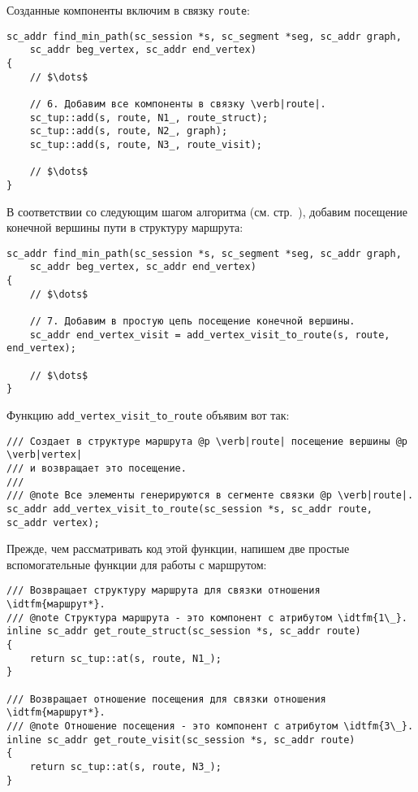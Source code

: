 Созданные компоненты включим в связку \lstinline|route|:

\begin{lstlisting}[texcl]
sc_addr find_min_path(sc_session *s, sc_segment *seg, sc_addr graph,
    sc_addr beg_vertex, sc_addr end_vertex)
{
    // $\dots$

    // 6. Добавим все компоненты в связку \verb|route|.
    sc_tup::add(s, route, N1_, route_struct);
    sc_tup::add(s, route, N2_, graph);
    sc_tup::add(s, route, N3_, route_visit);

    // $\dots$
}
\end{lstlisting}

В соответствии со следующим шагом алгоритма
(см. стр.~\pageref{astep:S9_Add_end_visit_to_route_tuple}),
добавим посещение конечной вершины пути в структуру маршрута:

\begin{lstlisting}[texcl]
sc_addr find_min_path(sc_session *s, sc_segment *seg, sc_addr graph,
    sc_addr beg_vertex, sc_addr end_vertex)
{
    // $\dots$

    // 7. Добавим в простую цепь посещение конечной вершины.
    sc_addr end_vertex_visit = add_vertex_visit_to_route(s, route, end_vertex);

    // $\dots$
}
\end{lstlisting}

Функцию \lstinline|add_vertex_visit_to_route| объявим вот так:

\begin{lstlisting}[texcl]
/// Создает в структуре маршрута @p \verb|route| посещение вершины @p \verb|vertex|
/// и возвращает это посещение.
///
/// @note Все элементы генерируются в сегменте связки @p \verb|route|.
sc_addr add_vertex_visit_to_route(sc_session *s, sc_addr route, sc_addr vertex);
\end{lstlisting}

Прежде, чем рассматривать код этой функции, напишем две простые
вспомогательные функции для работы с маршрутом:

\begin{lstlisting}[texcl]
/// Возвращает структуру маршрута для связки отношения \idtfm{маршрут*}.
/// @note Структура маршрута - это компонент с атрибутом \idtfm{1\_}.
inline sc_addr get_route_struct(sc_session *s, sc_addr route)
{
    return sc_tup::at(s, route, N1_);
}

/// Возвращает отношение посещения для связки отношения \idtfm{маршрут*}.
/// @note Отношение посещения - это компонент с атрибутом \idtfm{3\_}.
inline sc_addr get_route_visit(sc_session *s, sc_addr route)
{
    return sc_tup::at(s, route, N3_);
}
\end{lstlisting}

